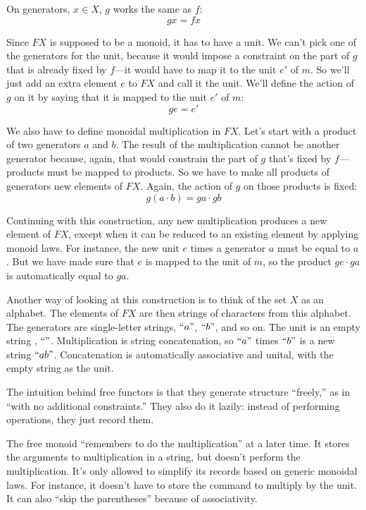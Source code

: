 \documentclass[DaoFP]{subfiles}
\begin{document}
On generators, $x \in X$, $g$ works the same as $f$:
\[ g x = f x \]

Since $F X$ is supposed to be a monoid, it has to have a unit. We can't pick one of the generators for the unit, because it would impose a constraint on the part of $g$ that is already fixed by $f$---it would have to map it to the unit $e'$ of $m$. So we'll just add an extra element $e$ to $F X$ and call it the unit. We'll define the action of $g$ on it by saying that it is mapped to the unit $e'$ of $m$:
\[ g e = e' \]

We also have to define monoidal multiplication in $F X$. Let's start with a product of two generators $a$ and $b$. The result of the multiplication cannot be another generator because, again, that would constrain the part of $g$ that's fixed by $f$---products must be mapped to products. So we have to make all products of generators new elements of $F X$. Again, the action of $g$ on those products is fixed:
\[ g (a \cdot b)  = g a \cdot g b\]

Continuing with this construction, any new multiplication produces a new element of $F X$, except when it can be reduced to an existing element by applying monoid laws. For instance, the new unit $e$ times a generator $a$ must be equal to $a$. But we have made sure that $e$ is mapped to the unit of $m$, so the product $g e \cdot g a$ is automatically equal to $g a$.

Another way of looking at this construction is to think of the set $X$ as an alphabet. The elements of $F X$ are then strings of characters from this alphabet. The generators are single-letter strings, $``a"$, $``b"$, and so on. The unit is an empty string , $``"$. Multiplication is string concatenation, so  $``a"$ times $``b"$ is a new string  $``ab"$. Concatenation is automatically associative and unital, with the empty string as the unit.

The intuition behind free functors is that they generate structure ``freely,'' as in ``with no additional constraints.'' They also do it lazily: instead of performing operations, they just record them. 

The free monoid ``remembers to do the multiplication'' at a later time. It stores the arguments to multiplication in a string, but doesn't perform the multiplication. It's only allowed to simplify its records based on generic monoidal laws. For instance, it doesn't have to store the command to multiply by the unit. It can also ``skip the parentheses'' because of associativity. 
\end{document}
